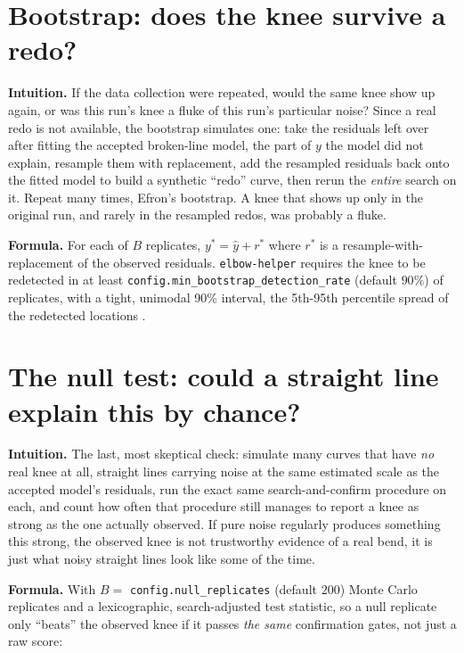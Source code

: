 \documentclass[11pt]{article}
\newcommand{\code}[1]{\texttt{#1}}
\begin{document}
\section{Bootstrap: does the knee survive a redo?}

\textbf{Intuition.} If the data collection were repeated, would the same
knee show up again, or was this run's knee a fluke of this run's
particular noise? Since a real redo is not available, the bootstrap
simulates one: take the residuals left over after fitting the accepted
broken-line model, the part of $y$ the model did not explain, resample them
with replacement, add the resampled residuals back onto the fitted model to
build a synthetic ``redo'' curve, then rerun the \emph{entire} search on
it. Repeat many times, Efron's bootstrap. A knee that shows up only in the
original run, and rarely in the resampled redos, was probably a fluke.

\textbf{Formula.} For each of $B$ replicates, $y^\ast = \hat y + r^\ast$
where $r^\ast$ is a resample-with-replacement of the observed residuals.
\code{elbow-helper} requires the knee to be redetected in at least
\code{config.\allowbreak min\_bootstrap\_detection\_rate} (default $90\%$) of
replicates, with a tight, unimodal 90\% interval, the 5th-95th percentile
spread of the redetected locations \citep{efron1979} \citep{hastie2009esl}.

\section{The null test: could a straight line explain this by chance?}
\label{sec:null-test}

\textbf{Intuition.} The last, most skeptical check: simulate many curves
that have \emph{no} real knee at all, straight lines carrying noise at the
same estimated scale as the accepted model's residuals, run the exact same
search-and-confirm procedure on each, and count how often that procedure
still manages to report a knee as strong as the one actually observed. If
pure noise regularly produces something this strong, the observed knee is
not trustworthy evidence of a real bend, it is just what noisy straight
lines look like some of the time.

\textbf{Formula.} With $B = $ \code{config.null\_replicates} (default
$200$) Monte Carlo replicates and a lexicographic, search-adjusted test
statistic, so a null replicate only ``beats'' the observed knee if it
passes \emph{the same} confirmation gates, not just a raw score:
\end{document}

